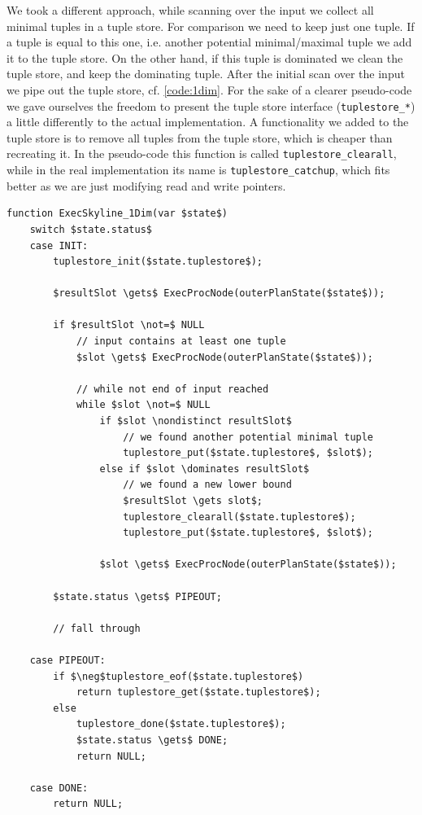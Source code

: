 We took a different approach, while scanning over the input we collect
all minimal tuples in a tuple store.  For
comparison we need to keep just one tuple.  If a tuple is equal to
this one, i.e. another potential minimal/maximal tuple we add it to the
tuple store.  On the other hand, if this tuple is dominated we clean
the tuple store, and keep the dominating tuple.  After the initial
scan over the input we pipe out the tuple store,
cf. \autoref{code:1dim}.  For the sake of a clearer pseudo-code we
gave ourselves the freedom to present the tuple store interface
(\texttt{tuplestore\_*}) a little differently to the actual
implementation.  A functionality we added to the tuple store is to
remove all tuples from the tuple store, which is cheaper than
recreating it.  In the pseudo-code this function is called
\texttt{tuplestore\_clearall}, while in the real implementation its name
is \texttt{tuplestore\_catchup}, which fits better as we are just
modifying read and write pointers.

\begin{lstlisting}[language=pseudo,
caption={Special case: 1 dimensional},
label={code:1dim}
]
function ExecSkyline_1Dim(var $state$)
	switch $state.status$
	case INIT:
		tuplestore_init($state.tuplestore$);

		$resultSlot \gets$ ExecProcNode(outerPlanState($state$));

		if $resultSlot \not=$ NULL
			// input contains at least one tuple
			$slot \gets$ ExecProcNode(outerPlanState($state$));

			// while not end of input reached
			while $slot \not=$ NULL
				if $slot \nondistinct resultSlot$
					// we found another potential minimal tuple
					tuplestore_put($state.tuplestore$, $slot$);
				else if $slot \dominates resultSlot$
					// we found a new lower bound
					$resultSlot \gets slot$;
					tuplestore_clearall($state.tuplestore$);
					tuplestore_put($state.tuplestore$, $slot$);

				$slot \gets$ ExecProcNode(outerPlanState($state$));

		$state.status \gets$ PIPEOUT;

		// fall through

	case PIPEOUT:
		if $\neg$tuplestore_eof($state.tuplestore$)
			return tuplestore_get($state.tuplestore$);
		else
			tuplestore_done($state.tuplestore$);
			$state.status \gets$ DONE;
			return NULL;

	case DONE:
		return NULL;
\end{lstlisting}

